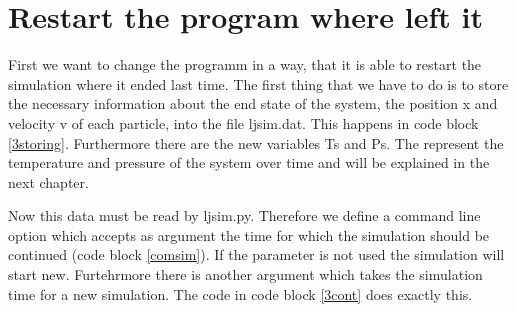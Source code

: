 \section{Restart the program where left it}

First we want to change the programm in a way, that it is able to restart the simulation where it ended last time.
The first thing that we have to do is to store the necessary information about the end state of the system, the position x and velocity v of each particle, into the file ljsim.dat. 
This happens in code block \ref{3storing}.
Furthermore there are the new variables Ts and Ps.
The represent the temperature and pressure of the system over time and will be explained in the next chapter.



Now this data must be read by ljsim.py.
Therefore we define a command line option  which accepts as argument the time for which the simulation should be continued (code block \ref{comsim}).
If the parameter is not used the simulation will start new.
Furtehrmore there is another argument  which takes the simulation time for a new simulation.
The code in code block \ref{3cont} does exactly this.


